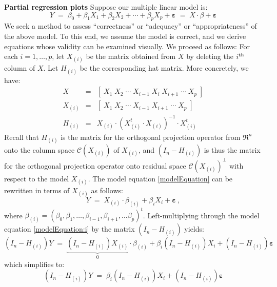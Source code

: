 \documentclass{article}
\begin{document}
\vskip 0.75cm
\noindent
\textbf{Partial regression plots} \vskip 0.1cm
Suppose our multiple linear model is:
\begin{equation}\label{modelEquation}
Y \; = \; \beta_{0} + \beta_{1} X_{1} + \beta_{2} X_{2} + \cdots + \beta_{p} X_{p} + \mathbf{\varepsilon}
\; = \; X \cdot \beta + \mathbf{\varepsilon}
\end{equation}
We seek a method to assess ``correctness'' or ``adequacy'' or ``appropriateness'' of the above model.
To this end, we assume the model is correct, and we derive equations whose validity can be examined visually.
We proceed as follows: For each $i = 1,\ldots,p$, let $X_{(i)}$ be the matrix obtained from $X$ by deleting the
$i^{\textnormal{th}}$ column of $X$. Let $H_{(i)}$ be the corresponding hat matrix.
More concretely, we have:
\begin{eqnarray*}
X & = & \left[\; X_{1} \; X_{2} \; \cdots \; X_{i-1} \; X_{i} \; X_{i+1} \; \cdots \; X_{p} \;\right] \\
X_{(i)} & = & \left[\; X_{1} \; X_{2} \; \cdots \; X_{i-1} \; X_{i+1} \; \cdots \; X_{p} \;\right] \\
H_{(i)} & = & X_{(i)} \cdot \left( X_{(i)}^{t} \cdot X_{(i)} \right)^{-1} \cdot X_{(i)}^{t}
\end{eqnarray*}
Recall that $H_{(i)}$ is the matrix for the orthogonal projection operator from $\Re^{n}$ onto the column space
$\mathcal{C}\!\left(X_{(i)}\right)$ of $X_{(i)}$, and $\left(I_{n} - H_{(i)}\right)$ is thus the matrix for the orthogonal
projection operator onto residual space $\mathcal{C}\!\left(X_{(i)}\right)^{\perp}$ with respect to the model $X_{(i)}$.
The model equation \eqref{modelEquation} can be rewritten in terms of $X_{(i)}$ as follows:
\begin{equation}\label{modelEquation:i}
Y \; = \; X_{(i)} \cdot \beta_{(i)} + \beta_{i}X_{i} + \mathbf{\varepsilon}\,,
\end{equation}
where $\beta_{(i)} = \left(\beta_{0}, \beta_{1}, \ldots, \beta_{i-1}, \beta_{i+1}, \ldots \beta_{p} \right)^{t}$.
Left-multiplying through the model equation \eqref{modelEquation:i} by the matrix $\left(I_{n} - H_{(i)}\right)$ yields:
\begin{equation*}
\left(I_{n} - H_{(i)}\right)Y
\;=\;
\underset{0}{\underbrace{\left(I_{n} - H_{(i)}\right)X_{(i)}}} \cdot \beta_{(i)}
        + \beta_{i}\left(I_{n} - H_{(i)}\right)X_{i} + \left(I_{n} - H_{(i)}\right)\mathbf{\varepsilon}
\end{equation*}
which simplifies to:
\begin{equation}\label{equation:partialRegression}
\left(I_{n} - H_{(i)}\right)Y
\;=\; \beta_{i}\left(I_{n} - H_{(i)}\right)X_{i} + \left(I_{n} - H_{(i)}\right)\mathbf{\varepsilon}
\end{equation}
\end{document}
